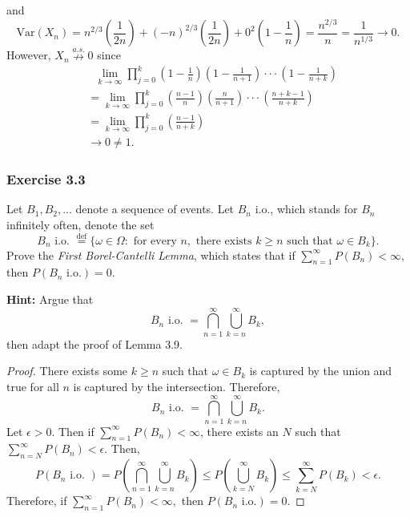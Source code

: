 \documentclass[12pt,]{article}
\begin{document}
\begin{enumerate}
  and
  \[\text{Var}(X_n)=n^{2/3}\left(\frac{1}{2n}\right) + (-n)^{2/3} \left(\frac{1}{2n}\right)+0^2\left(1-\frac{1}{n}\right)=\frac{n^{2/3}}{n}=\frac{1}{n^{1/3}}\rightarrow 0.\]
  However, \(X_n\overset{a.s.}\nrightarrow 0\) since \begin{align*}
  &\text{ } \lim_{k\rightarrow \infty}\prod_{j=0}^k \left(1-\frac{1}{n}\right)\left(1-\frac{1}{n+1}\right)\cdot\cdot\cdot \left(1-\frac{1}{n+k}\right)\\
  &=\lim_{k\rightarrow \infty}\prod_{j=0}^k \left(\frac{n-1}{n}\right)\left(\frac{n}{n+1}\right)\cdot\cdot\cdot \left(\frac{n+k-1}{n+k}\right)\\
  & =\lim_{k\rightarrow \infty}\prod_{j=0}^k \left(\frac{n-1}{n+k}\right)\\
  & \rightarrow 0\ne 1.
  \end{align*}
\end{enumerate}

\hypertarget{exercise-3.3}{%
\subsubsection{Exercise 3.3}\label{exercise-3.3}}

Let \(B_1, B_2, ...\) denote a sequence of events. Let \(B_n\) i.o.,
which stands for \(B_n\) infinitely often, denote the set
\[B_n \text{ i.o. }\overset{\text{def}} = \{\omega \in \Omega: \text{ for every } n, \text{ there exists } k\ge n \text{ such that } \omega \in B_k\}.\]
Prove the \textit{First Borel-Cantelli Lemma}, which states that if
\(\sum_{n=1}^\infty P(B_n) < \infty,\) then \(P(B_n \text{ i.o.})=0.\)

\textbf{Hint:} Argue that
\[B_n \text{ i.o. } = \bigcap_{n=1}^\infty \bigcup_{k=n}^\infty B_k,\]
then adapt the proof of Lemma 3.9.

\begin{proof}
There exists some $k \ge n$ such that $\omega \in B_k$ is captured by the union and true for all $n$ is captured by the intersection. Therefore, $$B_n \text{ i.o. } = \bigcap_{n=1}^\infty \bigcup_{k=n}^\infty B_k.$$ Let $\epsilon > 0.$ Then if $\sum_{n = 1}^\infty P(B_n) < \infty$, there exists an $N$ such that $\sum_{n=N}^\infty P(B_n) < \epsilon.$ Then,
$$P\left(B_n \text{ i.o. }\right) = P\left(\bigcap_{n=1}^\infty \bigcup_{k=n}^\infty B_k\right) \le P\left(\bigcup_{k=N}^\infty B_k\right)\le \sum_{k=N}^\infty P(B_k) < \epsilon.$$
Therefore, if $\sum_{n=1}^\infty P(B_n) < \infty,$ then $P(B_n \text{ i.o.})=0.$
\end{proof}
\end{document}
